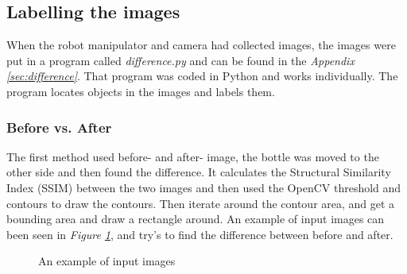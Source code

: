 \subsection{Labelling the images}\label{labelimg}
When the robot manipulator and camera had collected images, the images were put in a program called \textit{difference.py} and can be found in the \textit{Appendix \ref{sec:difference}}. That program was coded in Python and works individually. The program locates objects in the images and labels them. 
\subsubsection*{Before vs. After}\label{beforeandafter}
The first method used before- and after- image, the bottle was moved to the other side and then found the difference. It calculates the Structural Similarity Index (SSIM) between the two images and then used the OpenCV threshold and contours to draw the contours. Then iterate around the contour area, and get a bounding area and draw a rectangle around.
An example of input images can been seen in \textit{Figure \ref{figure: beforeafter}}, and try's to find the difference between before and after.
\begin{figure}[h]
    \centering
    \hfill
    \caption{An example of input images}
    \label{figure: beforeafter}
\end{figure}

